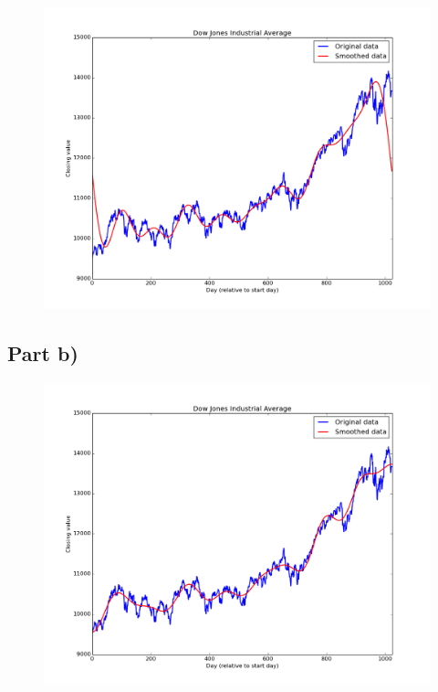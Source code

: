 \documentclass[a4paper,12pt]{article}
\begin{document}
\begin{figure}[H]
\centering
\includegraphics[width = \linewidth]{lab5q3a.png}
\caption{}
\label{fig:q3a}
\end{figure}

\subsection{Part b)}

\begin{figure}[H]
\centering
\includegraphics[width = \linewidth]{lab5q3b.png}
\caption{}
\label{fig:q3b}
\end{figure}
\end{document}
